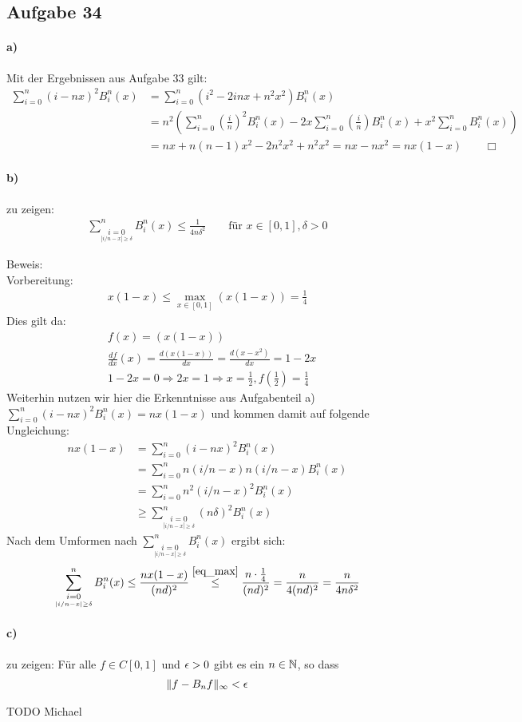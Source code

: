 \subsection*{Aufgabe 34}

\paragraph*{a)}
Mit der Ergebnissen aus Aufgabe 33 gilt:
\begin{align*}
  \sum_{i = 0}^n (i - n x)^2 B_i^n(x) &= \sum_{i = 0}^n (i^2 - 2 i n x + n^2x^2) B_i^n(x) \\
  & = n^2 \left(\sum_{i = 0}^n \left(\frac{i}{n}\right)^2   B_i^n(x) -
    2 x \sum_{i = 0}^n \left(\frac{i}{n}\right) B_i^n(x) + x^2 \sum_{i = 0}^n B_i^n(x) \right) \\
  & =  n x + n(n-1) x^2 - 2 n^2 x^2 + n^2 x^2 = n x - n x^2 = n x (1 - x) \qquad \Box
\end{align*}

\paragraph*{b)}
zu zeigen:\begin{align*}
\sum_{\underset{|i/n-x|\ge \delta}{i=0}}^n B_i^n(x) \le \frac{1}{4n\delta^2} \qquad \text{für } x \in[0,1], \delta >0
\end{align*}

Beweis:\\\newline
Vorbereitung:
\begin{align}\label{eq_max}
x(1-x) \le \max_{x\in[0,1]}(x(1-x))=\frac{1}{4}
\end{align}
Dies gilt da: \begin{align*}
&f(x)=(x(1-x))\\
&\frac{df}{dx}(x)=\frac{d(x(1-x))}{dx}=\frac{d(x-x^2)}{dx}=1-2x\\
&1-2x=0 \Rightarrow 2x=1 \Rightarrow x=\frac{1}{2}, f\left(\frac{1}{2}\right)=\frac{1}{4}
\end{align*}
Weiterhin nutzen wir hier die Erkenntnisse aus Aufgabenteil a)
$ \sum_{i = 0}^n (i - n x)^2 B_i^n(x)  = nx (1-x)$ und kommen damit auf folgende Ungleichung:
\begin{align}
nx (1-x) &=\sum_{i = 0}^n (i - n x)^2 B_i^n(x) \\&=\sum_{i = 0}^n n(i/n - x)n(i/n-x) B_i^n(x)\\&=\sum_{i = 0}^n n^2(i/n - x )^2 B_i^n(x) \\&\ge \sum_{\underset{|i/n-x|\ge \delta}{i=0}}^n (n\delta)^2 B_i^n(x)
\end{align}
Nach dem Umformen nach $\sum_{\underset{|i/n-x|\ge \delta}{i=0}}^n B_i^n(x)$ ergibt sich:
\begin{align}
\sum_{\underset{|i/n-x|\ge \delta}{i=0}}^n B_i^n(x) \le\frac{nx(1-x)}{(nd)^2}\overset{\eqref{eq_max}}{\le} \frac{n\cdot\frac{1}{4}}{(nd)^2}=\frac{n}{4(nd)^2}=\frac{n}{4n\delta^2}
\end{align}
\paragraph*{c)}
zu zeigen: Für alle $f \in C[0,1]$ und $\epsilon >0$ gibt es ein $n\in \mathbb N$, so dass\begin{align*}
\|f-B_nf\|_\infty < \epsilon
\end{align*}

TODO Michael